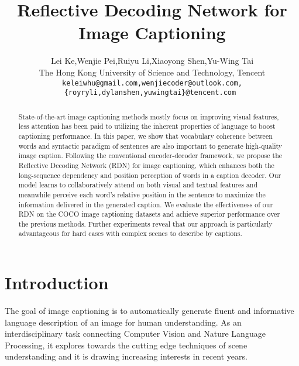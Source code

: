 \documentclass[10pt,twocolumn,letterpaper]{article}
\begin{document}
	
\title{Reflective Decoding Network for Image Captioning}
	
\author{
	Lei Ke,\hspace{1.0cm}Wenjie Pei,\hspace{1.0cm}Ruiyu Li,\hspace{1.0cm}Xiaoyong Shen,\hspace{1.0cm}Yu-Wing Tai
	\vspace{0.1cm}\\
	The Hong Kong University of Science and Technology,  Tencent
	\\
	\texttt{\footnotesize keleiwhu@gmail.com,wenjiecoder@outlook.com,\{royryli,dylanshen,yuwingtai\}@tencent.com }}

\maketitle
	\thispagestyle{empty}

\begin{abstract}	
State-of-the-art image captioning methods mostly focus on improving visual features, less attention has been paid to utilizing the inherent properties of language to boost captioning performance. 
In this paper, we show that vocabulary coherence between words and syntactic paradigm of sentences are also important to generate high-quality image caption.
Following the conventional encoder-decoder framework, we propose the Reflective Decoding Network (RDN) for image captioning, which enhances both the long-sequence dependency and position perception of words in a caption decoder.
Our model learns to collaboratively attend on both visual and textual features and meanwhile perceive each word's relative position in the sentence to maximize the information delivered in the generated caption.
We evaluate the effectiveness of our RDN on the COCO image captioning datasets and achieve superior performance over the previous methods.
Further experiments reveal that our approach is particularly advantageous for hard cases with complex scenes to describe by captions.




\vspace{-0.2in} \end{abstract}

\vspace{-2mm}
\section{Introduction}
The goal of image captioning is to automatically generate fluent and informative language description of an image for human understanding.
As an interdisciplinary task connecting Computer Vision and Nature Language Processing, it explores towards
the cutting edge techniques of scene understanding \cite{li2009towards} and it is drawing increasing interests in recent years.
\end{document}

